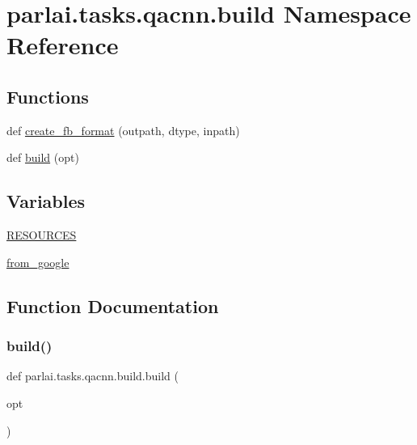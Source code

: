 \hypertarget{namespaceparlai_1_1tasks_1_1qacnn_1_1build}{}\section{parlai.\+tasks.\+qacnn.\+build Namespace Reference}
\label{namespaceparlai_1_1tasks_1_1qacnn_1_1build}
\subsection*{Functions}
\begin{DoxyCompactItemize}
\item 
def \hyperlink{namespaceparlai_1_1tasks_1_1qacnn_1_1build_add8d5f440ef973d77d8f63cc11197dce}{create\+\_\+fb\+\_\+format} (outpath, dtype, inpath)
\item 
def \hyperlink{namespaceparlai_1_1tasks_1_1qacnn_1_1build_a75d46e5e4248f77e7a6b83c7038144fa}{build} (opt)
\end{DoxyCompactItemize}
\subsection*{Variables}
\begin{DoxyCompactItemize}
\item 
\hyperlink{namespaceparlai_1_1tasks_1_1qacnn_1_1build_a5573dcfd7b1ecf634c159df1ae25e94f}{R\+E\+S\+O\+U\+R\+C\+ES}
\item 
\hyperlink{namespaceparlai_1_1tasks_1_1qacnn_1_1build_a802bd82198e0cfcccf501ee4ea910636}{from\+\_\+google}
\end{DoxyCompactItemize}


\subsection{Function Documentation}
\mbox{\label{namespaceparlai_1_1tasks_1_1qacnn_1_1build_a75d46e5e4248f77e7a6b83c7038144fa}} 
\subsubsection{\texorpdfstring{build()}{build()}}
{\footnotesize\ttfamily def parlai.\+tasks.\+qacnn.\+build.\+build (\begin{DoxyParamCaption}\item[{}]{opt }\end{DoxyParamCaption})}



